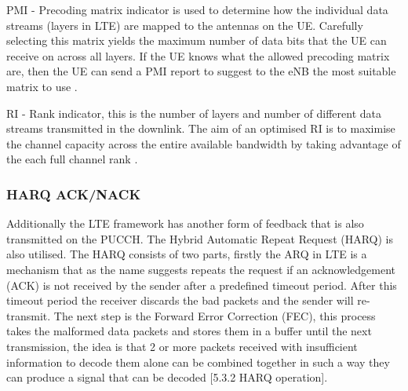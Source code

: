 \documentclass{article}
\begin{document}
PMI - Precoding matrix indicator is used to determine how the individual data streams (layers in LTE) are mapped to the antennas on the UE. Carefully selecting this matrix yields the maximum number of data bits that the UE can receive on across all layers. If the UE knows what the allowed precoding matrix are, then the UE can send a PMI report to suggest to the eNB the most suitable matrix to use \cite{csi_defs}.

RI - Rank indicator,  this is the number of layers and number of different data streams transmitted in the downlink. The aim of an optimised RI is to maximise the channel capacity across the entire available bandwidth by taking advantage of the each full channel rank  \cite{csi_defs}. 

\subsubsection{HARQ ACK/NACK}

Additionally the LTE framework has another form of feedback that is also transmitted on the PUCCH. The Hybrid Automatic Repeat Request (HARQ) is also utilised. The HARQ consists of two parts, firstly the ARQ in LTE is a mechanism that as the name suggests repeats the request if an acknowledgement (ACK) is not received by the sender after a predefined timeout period.  After this timeout period the receiver discards the bad packets and the sender will re-transmit. The next step is the Forward Error Correction (FEC), this process takes the malformed data packets and stores them in a buffer until the next transmission, the idea is that 2 or more packets received with insufficient information to decode them alone can be combined together in such a way they can produce a signal that can be decoded \cite{3gpp36321}[5.3.2 HARQ operation].
\end{document}
